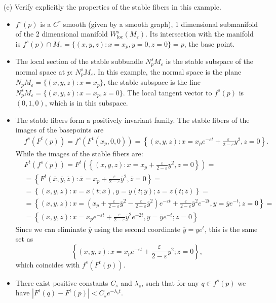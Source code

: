 \documentclass[a4paper,11pt,pdftex]{article}
\begin{document}
(e) Verify explicitly the properties of the stable fibers in this example.
\begin{itemize}
    \item $f^s(p)$ is a $C^r$ smooth (given by a smooth graph), 1 dimensional submanifold of the 2 dimensional manifold $W^s_\text{loc}(M_\varepsilon)$. Its intersection with the manifold is $f^s(p)\cap M_\varepsilon = \{(x,y,z):x=x_p, y=0, z=0 \} = p $, the base point.
    \item The local section of the stable subbundle $N^s_pM_\varepsilon$ is the stable subspace of the normal space at $p$: $N^s_pM_\varepsilon$. In this example, the normal space is the plane $N_p M_\varepsilon = \{ (x,y,z) : x=x_p\}$, the stable subspace is the line $N^s_p M_\varepsilon = \{ (x,y,z) : x=x_p, z=0\}$. The local tangent vector to $f^s(p)$ is $(0, 1, 0)$, which is in this subspace. 
    \item The stable fibers form a positively invariant family.
    The stable fibers of the images of the basepoints are
    \begin{align*}
        &f^s(F^t(p)) = f^s(F^t(x_p,0,0)) = \left\{ (x,y,z): x = x_p e^{-\varepsilon t}+ \frac{\varepsilon}{2-\varepsilon}y^2, z=0 \right\}. 
    \end{align*}
    While the images of the stable fibers are:
    \begin{align*}
        &F^t(f^s(p)) = F^t\left(\left\{ (x,y,z): x = x_p+ \frac{\varepsilon}{2-\varepsilon}y^2, z=0 \right\}\right) = \\
    &=\left\{ F^t(\overline{x},\overline{y},\overline{z}): \overline{x} = x_p + \frac{\varepsilon}{2-\varepsilon}\overline{y}^2, \overline{z}=0 \right\} = \\
    & = \left\{ (x,y,z): x = x(t; \overline{x}), y= y(t;\overline{y}); z=z(t;\overline{z}) \right\} = \\
    &= \left\{ (x,y,z): x = \left(x_p + \frac{\varepsilon}{2-\varepsilon}\overline{y}^2 - \frac{\varepsilon}{2-\varepsilon}\overline{y}^2 \right)e^{-\varepsilon t} + \frac{\varepsilon}{2-\varepsilon}\overline{y}^2 e^{-2t}, y= \overline{y}e^{-t}; z = 0 \right\} =\\  
    & = \left\{ (x,y,z): x = x_p e^{-\varepsilon t} + \frac{\varepsilon}{2-\varepsilon}\overline{y}^2 e^{-2t}, y= \overline{y}e^{-t}; z = 0 \right\}
    \end{align*}
    Since we can eliminate $\overline{y}$ using the second coordinate $\overline{y}=ye^t$, this is the same set as
    $$
    \left\{ (x,y,z): x = x_p e^{-\varepsilon t} + \frac{\varepsilon}{2-\varepsilon}y^2 ; z = 0 \right\},
    $$
    which coincides with $f^s(F^t(p))$.
    \item There exist positive constants $C_s$ and $\lambda_s$, such that for any $q \in f^s(p)$ we have $|F^t(q)-F^t(p)|< C_s e^{-\lambda_s t}$.
    

\end{itemize}
\end{document}
